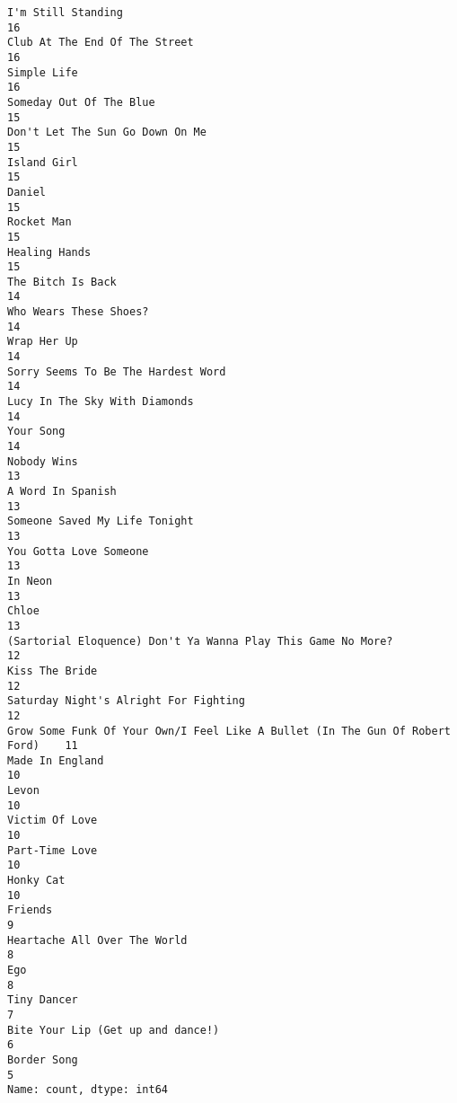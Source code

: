 \documentclass[
  a4paper,
]{scrbook}
\begin{document}
\begin{verbatim}
I'm Still Standing                                                             16
Club At The End Of The Street                                                  16
Simple Life                                                                    16
Someday Out Of The Blue                                                        15
Don't Let The Sun Go Down On Me                                                15
Island Girl                                                                    15
Daniel                                                                         15
Rocket Man                                                                     15
Healing Hands                                                                  15
The Bitch Is Back                                                              14
Who Wears These Shoes?                                                         14
Wrap Her Up                                                                    14
Sorry Seems To Be The Hardest Word                                             14
Lucy In The Sky With Diamonds                                                  14
Your Song                                                                      14
Nobody Wins                                                                    13
A Word In Spanish                                                              13
Someone Saved My Life Tonight                                                  13
You Gotta Love Someone                                                         13
In Neon                                                                        13
Chloe                                                                          13
(Sartorial Eloquence) Don't Ya Wanna Play This Game No More?                   12
Kiss The Bride                                                                 12
Saturday Night's Alright For Fighting                                          12
Grow Some Funk Of Your Own/I Feel Like A Bullet (In The Gun Of Robert Ford)    11
Made In England                                                                10
Levon                                                                          10
Victim Of Love                                                                 10
Part-Time Love                                                                 10
Honky Cat                                                                      10
Friends                                                                         9
Heartache All Over The World                                                    8
Ego                                                                             8
Tiny Dancer                                                                     7
Bite Your Lip (Get up and dance!)                                               6
Border Song                                                                     5
Name: count, dtype: int64
\end{verbatim}
\end{document}

